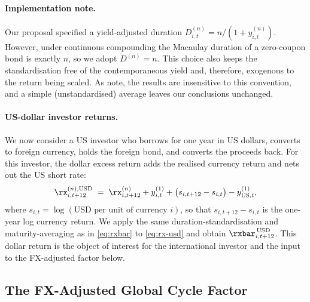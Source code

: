 \paragraph{Implementation note.} Our proposal specified a yield-adjusted
duration $D^{(n)}_{i,t}=n/(1+y^{(n)}_{i,t})$. However, under continuous
compounding the Macaulay duration of a zero-coupon bond is exactly $n$, so we
adopt $D^{(n)}=n$. This choice also keeps the standardisation free of the
contemporaneous yield and, therefore, exogenous to the return being scaled. As
\citet{cieslak2015} note, the results are insensitive to this convention, and a
simple (unstandardised) average leaves our conclusions unchanged.

\paragraph{US-dollar investor returns.}
We now consider a US investor who borrows for one year in US dollars, converts
to foreign currency, holds the foreign bond, and converts the proceeds back.
For this investor, the dollar excess return adds the realised currency return
and nets out the US short rate:
\begin{equation}
  \rx^{(n),\mathrm{USD}}_{i,t+12}
    \;=\; \rx^{(n)}_{i,t+12} + y^{(1)}_{i,t}
          + \big(s_{i,t+12}-s_{i,t}\big) - y^{(1)}_{\mathrm{US},t},
  \label{eq:rx-usd}
\end{equation}
where $s_{i,t}=\log(\text{USD per unit of currency }i)$, so that
$s_{i,t+12}-s_{i,t}$ is the one-year log currency return. We apply the same
duration-standardisation and maturity-averaging as in \eqref{eq:rxbar} to
\eqref{eq:rx-usd} and obtain $\rxbar^{\,\mathrm{USD}}_{i,t+12}$. This dollar
return is the object of interest for the international investor and the input
to the FX-adjusted factor below.

\subsection{The FX-Adjusted Global Cycle Factor}
\label{sec:fw-fxgcf}

